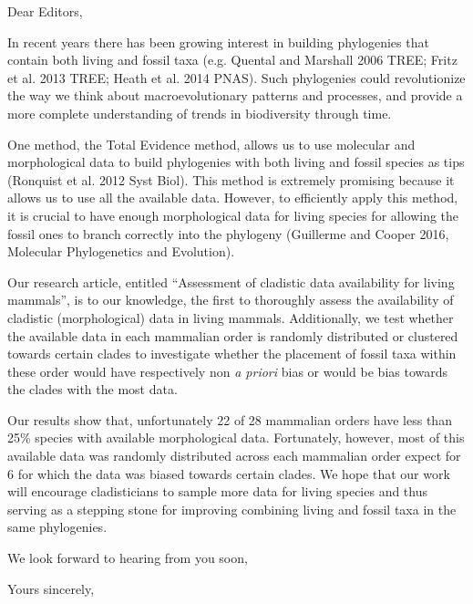 \documentclass[11pt]{letter}
\begin{document}
\begin{letter}{}
\opening{Dear Editors,}

In recent years there has been growing interest in building phylogenies that contain both living and fossil taxa (e.g. Quental and Marshall 2006 TREE; Fritz et al. 2013 TREE; Heath et al. 2014 PNAS).
Such phylogenies could revolutionize the way we think about macroevolutionary patterns and processes, and provide a more complete understanding of trends in biodiversity through time.

One method, the Total Evidence method, allows us to use molecular and morphological data to build phylogenies with both living and fossil species as tips (Ronquist et al. 2012 Syst Biol).
This method is extremely promising because it allows us to use all the available data. However, to efficiently apply this method, it is crucial to have enough morphological data for living species for allowing the fossil ones to branch correctly into the phylogeny (Guillerme and Cooper 2016, Molecular Phylogenetics and Evolution).

Our research article, entitled ``Assessment of cladistic data availability for living mammals'', is to our knowledge, the first to thoroughly assess the availability of cladistic (morphological) data in living mammals.
Additionally, we test whether the available data in each mammalian order is randomly distributed or clustered towards certain clades to investigate whether the placement of fossil taxa within these order would have respectively non \textit{a priori} bias or would be bias towards the clades with the most data.

Our results show that, unfortunately 22 of 28 mammalian orders have less than 25\% species with available morphological data.
Fortunately, however, most of this available data was randomly distributed across each mammalian order expect for 6 for which the data was biased towards certain clades.
We hope that our work will encourage cladisticians %
to sample more data for living species and thus serving as a stepping stone for improving combining living and fossil taxa in the same phylogenies.

We look forward to hearing from you soon,


\closing{Yours sincerely,}


\end{letter}
\end{document}
